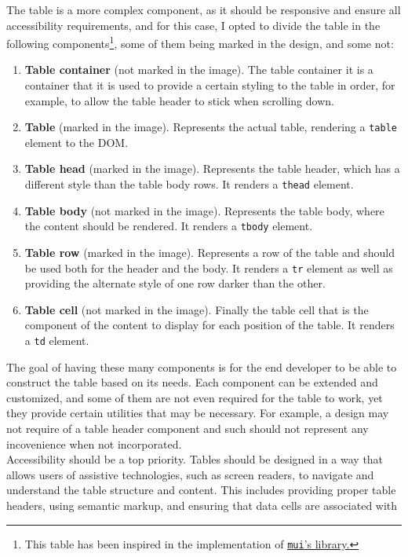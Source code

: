 \documentclass[./memory.tex]{subfiles}
\begin{document}
The table is a more complex component, as it should be responsive and ensure all
accessibility requirements, and for this case, I opted to divide the table in
the following components\footnote{This table has been inspired in the
	implementation of \href{https://mui.com/material-ui/react-table/}{\texttt{mui}'s
		library.}}, some of them being marked in the design, and some not:
\begin{enumerate}[label = -]
	\item\textbf{Table container} (not marked in the image). The table container
	it is a container that it is used to provide a certain styling to the
	table in order, for example, to allow the table header to stick when
	scrolling down.
	\item\textbf{Table} (marked in the image). Represents the actual table,
	rendering a \texttt{table} element to the DOM.
	\item\textbf{Table head} (marked in the image). Represents the table header,
	which has a different style than the table body rows. It renders a
	\texttt{thead} element.
	\item\textbf{Table body} (not marked in the image). Represents the table
	body, where the content should be rendered. It renders a \texttt{tbody}
	element.
	\item\textbf{Table row} (marked in the image). Represents a row of the table
	and should be used both for the header and the body. It renders a
	\texttt{tr} element as well as providing the alternate style of one row
	darker than the other.
	\item\textbf{Table cell} (not marked in the image). Finally the table cell
	that is the component of the content to display for each position of the
	table. It renders a \texttt{td} element.
\end{enumerate}
The goal of having these many components is for the end developer to be able to
construct the table based on its needs. Each component can be extended and
customized, and some of them are not even required for the table to work, yet
they provide certain utilities that may be necessary. For example, a design may
not require of a table header component and such should not represent any
incovenience when not incorporated.
\\
Accessibility should be a top priority. Tables should be designed in a way that
allows users of assistive technologies, such as screen readers, to navigate and
understand the table structure and content. This includes providing proper table
headers, using semantic markup, and ensuring that data cells are associated with
\end{document}
